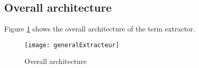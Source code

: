 
\subsection{Overall architecture}\label{sec:overall-architecture}

Figure \ref{general} shows the overall architecture of the term
extractor. 


\begin{figure}[!htbp]
\centering
\texttt{[image: generalExtracteur]}
\caption{Overall architecture}\label{general}
\end{figure}

\sloppy

